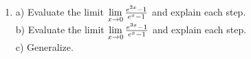 \begin{enumerate}
\end{enumerate}\section{} \begin{enumerate} 

\item  a)  Evaluate the limit $\mathop {\lim }\limits_{x \to 0} {{e^{2x}  - 1} \over {e^x  - 1}}$ and explain each step.  \\
b) Evaluate the limit $\mathop {\lim }\limits_{x \to 0} {{e^{3x}  - 1} \over {e^x  - 1}}$ and explain each step.  \\
c)	Generalize. 

\end{enumerate}


